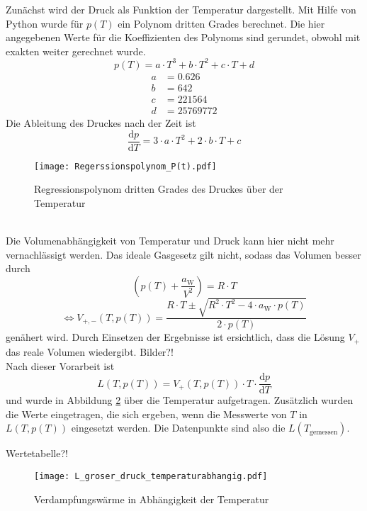 Zunächst wird der Druck als Funktion der Temperatur dargestellt. Mit Hilfe von Python wurde für $p(T)$ ein Polynom dritten Grades berechnet. Die hier angegebenen Werte für die Koeffizienten des Polynoms sind gerundet, obwohl mit exakten weiter gerechnet wurde.
\begin{equation}
p(T) = a \cdot T ^3 + b \cdot T^2 +c \cdot T + d
\end{equation}
\begin{align}
a &=0.626 \\
b &= 642 \\
c &= 221564 \\
d  &= 25769772
\end{align}
Die Ableitung des Druckes nach der Zeit ist
\begin{equation}
\frac{\text{d} p}{\text{d} T} = 3 \cdot a \cdot T^2 + 2 \cdot b \cdot T + c
\end{equation}
\begin{figure}[h!]
	\centering
	\texttt{[image: Regerssionspolynom\_P(t).pdf]}
	\caption{Regressionspolynom dritten Grades des Druckes über der Temperatur}
	\label{fig:Regerssionspolynom_P(t)}
\end{figure}
\\

Die Volumenabhängigkeit von Temperatur und Druck kann hier nicht mehr vernachlässigt werden. Das ideale Gasgesetz gilt nicht, sodass das Volumen besser durch
\begin{equation}
\left( p(T) + \frac{a_\text{W}}{V^2}\right) = R \cdot T
\end{equation}
\begin{equation}
\Leftrightarrow
V_{+,-}(T, p(T)) = \frac{R \cdot T \pm \sqrt{R^2 \cdot T^2 - 4 \cdot a_\text{W} \cdot p(T)}}{2 \cdot p(T)}
\end{equation}
genähert wird. Durch Einsetzen der Ergebnisse ist ersichtlich, dass die Lösung $V_+$ das reale Volumen wiedergibt. 
Bilder?!
\\
Nach dieser Vorarbeit ist
\begin{equation}
L(T, p(T)) = V_+(T, p(T)) \cdot T \cdot \frac{\text{d} p}{\text{d} T} 
\end{equation}
und wurde in Abbildung \ref{fig:L_groser_druck_temperaturabhangig} über die Temperatur aufgetragen. Zusätzlich wurden die Werte eingetragen, die sich ergeben, wenn die Messwerte von $T$ in $L(T, p(T))$ eingesetzt werden. Die Datenpunkte sind also die $L(T_\text{gemessen})$. 

Wertetabelle?!



\begin{figure}[h!]
	\centering
	\texttt{[image: L\_groser\_druck\_temperaturabhangig.pdf]}
	\caption{Verdampfungswärme in Abhängigkeit der Temperatur}
	\label{fig:L_groser_druck_temperaturabhangig}
\end{figure}





